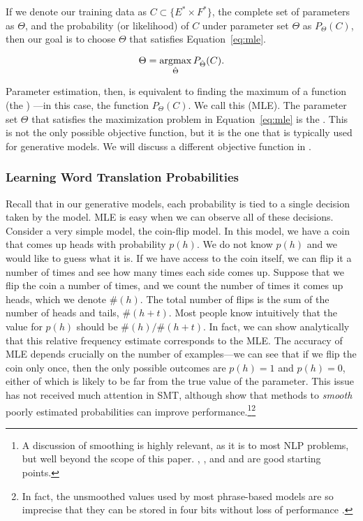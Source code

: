 If we denote our training data as $C \subset \{E^* \times F^*\}$, 
the complete set of parameters as $\Theta$, and the probability 
(or likelihood) of $C$ under parameter set $\Theta$ as 
$P_\Theta(C)$, then our goal is to choose $\Theta$ that
satisfies Equation~\ref{eq:mle}.

\begin{equation}\label{eq:mle} 
\Theta = \argmax_{\hat{\Theta}} P_{\hat{\Theta}}(C).  
\end{equation}

\noindent Parameter estimation, then, is equivalent to finding 
the maximum of a function (the )
---in this case, the  function $P_\Theta(C)$.  
We call this  (MLE).  
The parameter set $\Theta$ that satisfies the
maximization problem in Equation~\ref{eq:mle}
is the .  
This is not the only
possible objective function, but it is the one
that is typically used for generative models.  We will
discuss a different objective function in 
.

\subsubsection{Learning Word Translation Probabilities}
\label{sec:unsupervised-learning-generative}

Recall that in our generative models, each probability
is tied to a single decision taken by the model.
MLE is easy when we can observe all of these decisions.
Consider a very simple model, the coin-flip model.
In this model, we have a coin that comes up
heads with probability $p(h)$.  We do not know $p(h)$
and we would like to guess what it is.  If we have 
access to the coin itself, we can flip it a number 
of times and see how many times each side comes up.  
Suppose that we flip the coin a number of times, and
we count the number of times it comes up heads, which
we denote $\#(h)$.  The total number of flips is the
sum of the number of heads and tails, $\#(h+t)$.
Most people know intuitively
that the value for $p(h)$ should be $\#(h)/\#(h+t)$.  In fact,
we can show analytically that this relative 
frequency estimate corresponds to the MLE.
The accuracy of MLE depends crucially on the
number of examples---we
can see that if we flip the coin only once, then the
only possible outcomes are $p(h)=1$ and $p(h)=0$, either
of which is likely to be far from the true value of
the parameter.  This
issue has not received much attention in SMT,
although \citet{Foster:2006:emnlp} show that 
methods to {\em smooth} poorly estimated probabilities
can improve performance.\footnote{A discussion of smoothing
is highly relevant, as it is to most NLP problems, but
well beyond the scope of this paper.  
\citet{Chen:1998:tr}, \citet{Manning:1999:book}, and 
\citet{Jurafsky:2000:book}
and are good starting points.}\footnote{In fact, the unsmoothed values 
used by most phrase-based models are so
imprecise that they can be stored in four bits without
loss of performance \citep{Och:2005:wpt,Federico:2006:smt}.
}


